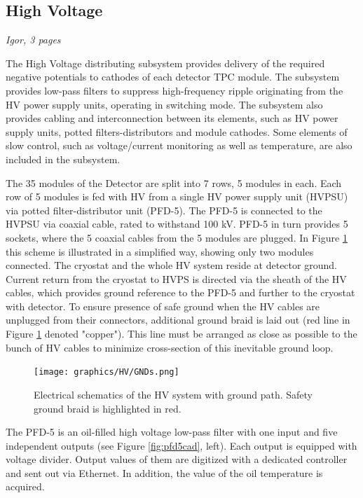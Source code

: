 \subsection{High Voltage}
\label{sec:lartpc-des-hv}
{\it Igor, 3 pages}

The High Voltage distributing subsystem provides delivery of the required negative potentials to cathodes of 
each detector TPC module. The subsystem provides low-pass filters to suppress high-frequency ripple originating from the HV power supply units, operating in switching mode. The subsystem also provides cabling and interconnection between its elements, such as HV power supply units, potted filters-distributors and module cathodes. Some elements of slow control, such as voltage/current monitoring as well as temperature, are also included in the subsystem.

The 35 modules of the Detector are split into 7 rows, 5 modules in each.
Each row of 5 modules is fed with HV from a single HV power supply unit (HVPSU) via potted filter-distributor unit (PFD-5).
The PFD-5 is connected to the HVPSU via coaxial cable, rated to withstand 100 kV. PFD-5 in turn provides 5 sockets, where the 5 coaxial cables from the 5 modules are plugged. In Figure \ref{fig:gndpath} this scheme is illustrated in a simplified way, showing only two modules connected. The cryostat and the whole HV system reside at detector ground. Current return from the cryostat to HVPS is directed via the sheath of the HV cables, which provides ground reference to the PFD-5 and further to the cryostat with detector. To ensure presence of safe ground when the HV cables are unplugged from their connectors, additional ground braid is laid out (red line in Figure \ref{fig:gndpath} denoted "copper"). This line must be arranged as close as possible to the bunch of HV cables to minimize cross-section of this inevitable ground loop.

\begin{figure}[htbp]
\centering 
\texttt{[image: graphics/HV/GNDs.png]}
\caption{\label{fig:gndpath} Electrical schematics of the HV system with ground path. Safety ground braid is highlighted in red.}
\end{figure}


The PFD-5 is an oil-filled high voltage low-pass filter with one input and five independent outputs (see Figure \ref{fig:pfd5cad}, left). Each output is equipped with voltage divider. Output values of them are digitized with a dedicated controller and sent out via Ethernet. In addition, the value of the oil temperature is acquired. 


